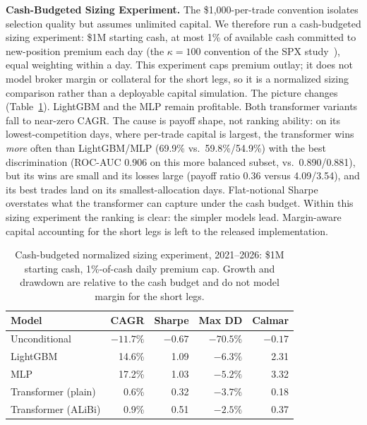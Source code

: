 \documentclass[sigconf,review,anonymous]{acmart}
\begin{document}
\medskip\noindent\textbf{Cash-Budgeted Sizing Experiment.}
\label{sec:capitalscaled}
The \$1{,}000-per-trade convention isolates selection quality but assumes unlimited capital. We therefore run a cash-budgeted sizing experiment: \$1M starting cash, at most 1\% of available cash committed to new-position premium each day (the $\kappa=100$ convention of the SPX study~\cite{glasserman2025tp2}), equal weighting within a day. This experiment caps premium outlay; it does not model broker margin or collateral for the short legs, so it is a normalized sizing comparison rather than a deployable capital simulation. The picture changes (Table~\ref{tab:capitalscaled}). LightGBM and the MLP remain profitable. Both transformer variants fall to near-zero CAGR. The cause is payoff shape, not ranking ability: on its lowest-competition days, where per-trade capital is largest, the transformer wins \emph{more} often than LightGBM/MLP (69.9\% vs.\ 59.8\%/54.9\%) with the best discrimination (ROC-AUC 0.906 on this more balanced subset, vs.\ 0.890/0.881), but its wins are small and its losses large (payoff ratio 0.36 versus 4.09/3.54), and its best trades land on its smallest-allocation days. Flat-notional Sharpe overstates what the transformer can capture under the cash budget. Within this sizing experiment the ranking is clear: the simpler models lead. Margin-aware capital accounting for the short legs is left to the released implementation.

\begin{table}[t]
\centering
\footnotesize
\begin{tabular}{lrrrr}
\toprule
Model & CAGR & Sharpe & Max DD & Calmar \\
\midrule
Unconditional & $-11.7\%$ & $-0.67$ & $-70.5\%$ & $-0.17$ \\
LightGBM & 14.6\% & 1.09 & $-6.3\%$ & 2.31 \\
MLP & 17.2\% & 1.03 & $-5.2\%$ & 3.32 \\
Transformer (plain) & 0.6\% & 0.32 & $-3.7\%$ & 0.18 \\
Transformer (ALiBi) & 0.9\% & 0.51 & $-2.5\%$ & 0.37 \\
\bottomrule
\end{tabular}
\caption{Cash-budgeted normalized sizing experiment, 2021--2026: \$1M starting cash, 1\%-of-cash daily premium cap. Growth and drawdown are relative to the cash budget and do not model margin for the short legs.}
\label{tab:capitalscaled}
\end{table}
\end{document}
